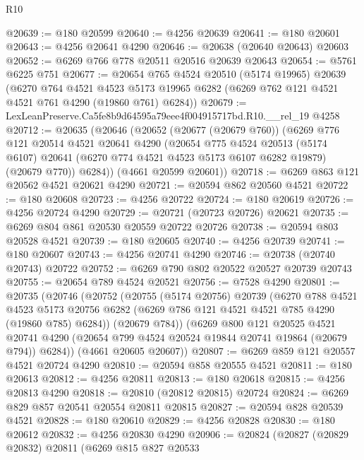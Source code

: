 \begin{lexlean}{R10}
\begin{coremodule}
@20639 := @180 @20599
@20640 := @4256 @20639
@20641 := @180 @20601
@20643 := @4256 @20641 @4290
@20646 := @20638 (@20640 @20643) @20603
@20652 := @6269 @766 @778 @20511 @20516 @20639 @20643
@20654 := @5761 @6225 @751
@20677 := @20654
    @765
    @4524
    @20510
    (@5174 @19965)
    @20639
    (@6270
      @764
      @4521
      @4523
      @5173
      @19965
      @6282
      (@6269 @762 @121 @4521 @4521 @761 @4290 (@19860 @761) @6284))
@20679 := LexLeanPreserve.Ca5fe8b9d64595a79eee4f004915717bd.R10.__rel_19 @4258
@20712 := @20635
    (@20646
      (@20652
        (@20677 (@20679 @760))
        (@6269
          @776
          @121
          @20514
          @4521
          @20641
          @4290
          (@20654
            @775
            @4524
            @20513
            (@5174 @6107)
            @20641
            (@6270 @774 @4521 @4523 @5173 @6107 @6282 @19879)
            (@20679 @770))
          @6284))
      (@4661 @20599 @20601))
@20718 := @6269 @863 @121 @20562 @4521 @20621 @4290
@20721 := @20594 @862 @20560 @4521
@20722 := @180 @20608
@20723 := @4256 @20722
@20724 := @180 @20619
@20726 := @4256 @20724 @4290
@20729 := @20721 (@20723 @20726) @20621
@20735 := @6269 @804 @861 @20530 @20559 @20722 @20726
@20738 := @20594 @803 @20528 @4521
@20739 := @180 @20605
@20740 := @4256 @20739
@20741 := @180 @20607
@20743 := @4256 @20741 @4290
@20746 := @20738 (@20740 @20743) @20722
@20752 := @6269 @790 @802 @20522 @20527 @20739 @20743
@20755 := @20654 @789 @4524 @20521
@20756 := @7528 @4290
@20801 := @20735
    (@20746
      (@20752
        (@20755
          (@5174 @20756)
          @20739
          (@6270
            @788
            @4521
            @4523
            @5173
            @20756
            @6282
            (@6269 @786 @121 @4521 @4521 @785 @4290 (@19860 @785) @6284))
          (@20679 @784))
        (@6269
          @800
          @121
          @20525
          @4521
          @20741
          @4290
          (@20654 @799 @4524 @20524 @19844 @20741 @19864 (@20679 @794))
          @6284))
      (@4661 @20605 @20607))
@20807 := @6269 @859 @121 @20557 @4521 @20724 @4290
@20810 := @20594 @858 @20555 @4521
@20811 := @180 @20613
@20812 := @4256 @20811
@20813 := @180 @20618
@20815 := @4256 @20813 @4290
@20818 := @20810 (@20812 @20815) @20724
@20824 := @6269 @829 @857 @20541 @20554 @20811 @20815
@20827 := @20594 @828 @20539 @4521
@20828 := @180 @20610
@20829 := @4256 @20828
@20830 := @180 @20612
@20832 := @4256 @20830 @4290
@20906 := @20824
    (@20827
      (@20829 @20832)
      @20811
      (@6269
        @815
        @827
        @20533

\end{coremodule}
\end{lexlean}
